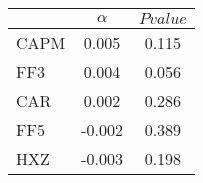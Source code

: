 \begin{tabular}{lcc}
\toprule
 & $\alpha$ & $Pvalue$ \\
\midrule
CAPM & 0.005 & 0.115 \\
FF3 & 0.004 & 0.056 \\
CAR & 0.002 & 0.286 \\
FF5 & -0.002 & 0.389 \\
HXZ & -0.003 & 0.198 \\
\bottomrule
\end{tabular}
